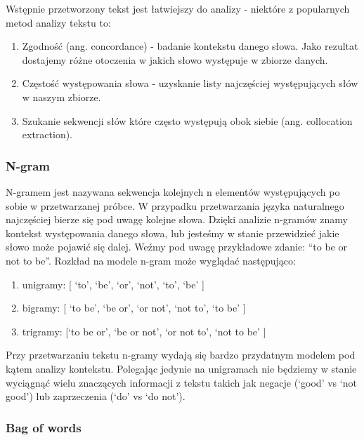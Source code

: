 Wstępnie przetworzony tekst jest łatwiejszy do analizy - niektóre z popularnych metod analizy tekstu to:

\begin{enumerate}
    \item Zgodność (ang. concordance) - badanie kontekstu danego słowa. Jako rezultat dostajemy różne otoczenia w jakich słowo występuje w zbiorze danych.
    
    \item Częstość występowania słowa - uzyskanie listy najczęściej występujących słów w naszym zbiorze.

    \item Szukanie sekwencji słów które często występują obok siebie (ang. collocation extraction).

\end{enumerate}

\subsubsection{N-gram}

N-gramem jest nazywana sekwencja kolejnych n elementów występujących po sobie w przetwarzanej próbce. W przypadku przetwarzania języka naturalnego najczęściej bierze się pod uwagę kolejne słowa. Dzięki analizie n-gramów znamy kontekst występowania danego słowa, lub jesteśmy w stanie przewidzieć jakie słowo może pojawić się dalej. Weźmy pod uwagę przykładowe zdanie: “to be or not to be”. Rozkład na modele n-gram może wyglądać następująco:

\begin{enumerate}
    \item unigramy: [ ‘to’, ‘be’, ‘or’, ‘not’, ‘to’, ‘be’ ] 
    \item bigramy: [ ‘to be’, ‘be or’, ‘or not’, ‘not to’, ‘to be’ ]
    \item trigramy: [‘to be or’, ‘be or not’, ‘or not to’, ‘not to be’ ]
\end{enumerate}

Przy przetwarzaniu tekstu n-gramy wydają się bardzo przydatnym modelem pod kątem analizy kontekstu. Polegając jedynie na unigramach nie będziemy w stanie wyciągnąć wielu znaczących informacji z tekstu takich jak negacje  (‘good’ vs ‘not good’) lub zaprzeczenia (‘do’ vs ‘do not’).

\subsubsection{Bag of words}

